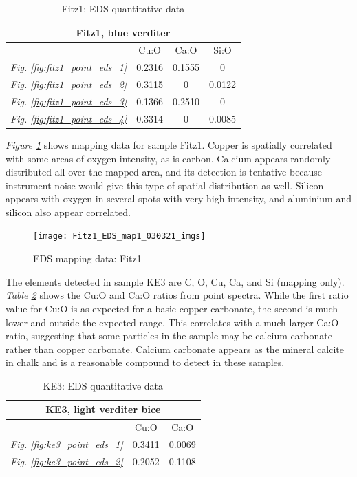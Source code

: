 \begin{table}[H]
\caption{Fitz1: EDS quantitative data}
\centering
\label{table:fitz1_ratios}
\begin{tabular}{c c c c}
\toprule
\multicolumn{4}{c}{Fitz1, blue verditer} \\
\midrule
~ & Cu:O & Ca:O & Si:O \\
\midrule
\textit{Fig. \ref{fig:fitz1_point_eds_1}} & 0.2316 & 0.1555 & 0 \\
\textit{Fig. \ref{fig:fitz1_point_eds_2}} & 0.3115 & 0 & 0.0122 \\
\textit{Fig. \ref{fig:fitz1_point_eds_3}} & 0.1366 & 0.2510 & 0 \\
\textit{Fig. \ref{fig:fitz1_point_eds_4}} & 0.3314 & 0 & 0.0085 \\
\bottomrule
\end{tabular}
\end{table}

\textit{Figure \ref{fig:fitz1_map1}} shows mapping data for sample Fitz1. Copper is spatially correlated with some areas of oxygen intensity, as is carbon. Calcium appears randomly distributed all over the mapped area, and its detection is tentative because instrument noise would give this type of spatial distribution as well. Silicon appears with oxygen in several spots with very high intensity, and aluminium and silicon also appear correlated.

\begin{figure}[H]
\centering
  \texttt{[image: Fitz1\_EDS\_map1\_030321\_imgs]}
\caption[EDS mapping data: Fitz1]{EDS mapping data: Fitz1}
\label{fig:fitz1_map1}
\end{figure}


The elements detected in sample KE3 are C, O, Cu, Ca, and Si (mapping only). \textit{Table \ref{table:ke3_ratios}} shows the Cu:O and Ca:O ratios from point spectra. While the first ratio value for Cu:O is as expected for a basic copper carbonate, the second is much lower and outside the expected range. This correlates with a much larger Ca:O ratio, suggesting that some particles in the sample may be calcium carbonate rather than copper carbonate. Calcium carbonate appears as the mineral calcite in chalk and is a reasonable compound to detect in these samples.

\begin{table}[H]
\caption{KE3: EDS quantitative data}
\centering
\label{table:ke3_ratios}
\begin{tabular}{c c c}
\toprule
\multicolumn{3}{c}{KE3, light verditer bice} \\
\midrule
~ & Cu:O & Ca:O \\
\midrule
\textit{Fig. \ref{fig:ke3_point_eds_1}} & 0.3411 & 0.0069 \\
\textit{Fig. \ref{fig:ke3_point_eds_2}} & 0.2052 & 0.1108 \\
\bottomrule
\end{tabular}
\end{table}

